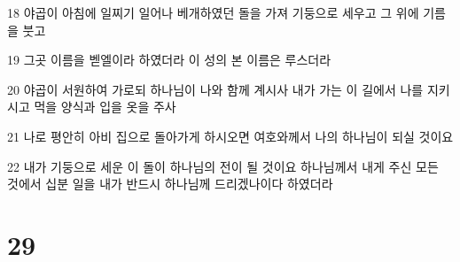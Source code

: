 \par 18 야곱이 아침에 일찌기 일어나 베개하였던 돌을 가져 기둥으로 세우고 그 위에 기름을 붓고
\par 19 그곳 이름을 벧엘이라 하였더라 이 성의 본 이름은 루스더라
\par 20 야곱이 서원하여 가로되 하나님이 나와 함께 계시사 내가 가는 이 길에서 나를 지키시고 먹을 양식과 입을 옷을 주사
\par 21 나로 평안히 아비 집으로 돌아가게 하시오면 여호와께서 나의 하나님이 되실 것이요
\par 22 내가 기둥으로 세운 이 돌이 하나님의 전이 될 것이요 하나님께서 내게 주신 모든 것에서 십분 일을 내가 반드시 하나님께 드리겠나이다 하였더라

\chapter{29}

